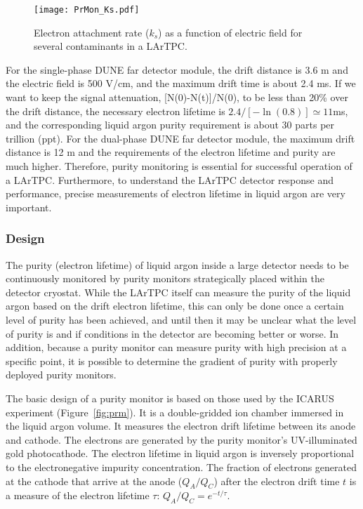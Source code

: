 \begin{figure}[h]
\centering
\texttt{[image: PrMon\_Ks.pdf]}
\caption{Electron attachment rate ($k_s$) as a function of electric field for several contaminants in a LArTPC.}\label{fig:ks}
\end{figure}


For the single-phase DUNE far detector module, the drift distance is 3.6 m and the electric field is 500 V/cm, and the maximum drift time is about 2.4 ms. If we want to keep the signal attenuation, [N(0)-N(t)]/N(0), to be less than  20\% over the drift distance, the necessary electron lifetime is $2.4/[-\ln(0.8)] \simeq 11 $ms, and the corresponding liquid argon purity requirement is about 30 parts per trillion (ppt). For the dual-phase DUNE far detector module, the maximum drift distance is 12 m and the requirements of the electron lifetime and purity are much higher. Therefore, purity monitoring is essential for successful operation of a LArTPC. Furthermore, to understand the LArTPC detector response and performance, precise measurements of electron lifetime in liquid argon are very important.

\subsubsection{Design}



The purity (electron lifetime) of liquid argon inside a large detector needs to be continuously monitored by purity monitors strategically placed within the detector cryostat. While the LArTPC itself can measure the purity of the liquid argon based on the drift electron lifetime, this can only be done once a certain level of purity has been achieved, and until then it may be unclear what the level of purity is and if conditions in the detector are becoming better or worse. In addition, because a purity monitor can measure purity with high precision at a specific point, it is possible to determine the gradient of purity with properly deployed purity monitors.


The basic design of a purity monitor is based on those used by the ICARUS experiment (Figure~\ref{fig:prm}). It is a double-gridded ion chamber immersed in the liquid argon volume. It measures the electron drift lifetime between its anode and cathode. The electrons are generated by the purity monitor's UV-illuminated gold photocathode. The electron lifetime in liquid argon is inversely proportional to the electronegative impurity concentration. The fraction of electrons generated at the cathode that arrive at the anode ($Q_A/Q_C$) after the electron drift time $t$ is a measure of the electron lifetime $\tau$: $Q_A/Q_C=e^{-t/\tau}$.

